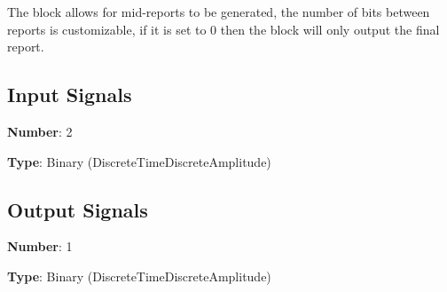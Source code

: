 The block allows for mid-reports to be generated, the number of bits between reports is customizable, if it is set to 0 then the block will only output the final report.

\subsection*{Input Signals}

\textbf{Number}: 2

\textbf{Type}: Binary (DiscreteTimeDiscreteAmplitude)

\subsection*{Output Signals}

\textbf{Number}: 1

\textbf{Type}: Binary (DiscreteTimeDiscreteAmplitude)


 
